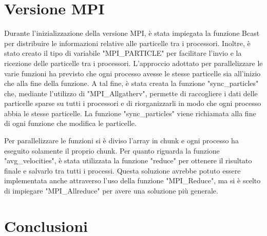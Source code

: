 \documentclass[a4paper,12pt, oneside]{article}
\begin{document}
\section{Versione MPI}

Durante l'inizializzazione della versione MPI, è stata impiegata la funzione Bcast per
distribuire le informazioni relative alle particelle tra i processori. Inoltre, è stato
creato il tipo di variabile "MPI\_PARTICLE" per facilitare l'invio e la ricezione delle
particelle tra i processori.
L'approccio adottato per parallelizzare le varie funzioni ha previsto che ogni processo
avesse le stesse particelle sia all'inizio che alla fine della funzione. A tal fine, è
stata creata la funzione "sync\_particles" che, mediante l'utilizzo di "MPI\_Allgatherv",
permette di raccogliere i dati delle particelle sparse su tutti i processori e di
riorganizzarli in modo che ogni processo abbia le stesse particelle. La funzione
"sync\_particles" viene richiamata alla fine di ogni funzione che modifica le particelle.

Per parallelizzare le funzioni si è diviso l'array in chunk e ogni processo ha eseguito
solamente il proprio chunk. Per quanto riguarda la funzione "avg\_velocities", è stata
utilizzata la funzione "reduce" per ottenere il risultato finale e salvarlo tra tutti i
processi. Questa soluzione avrebbe potuto essere implementata anche attraverso l'uso
della funzione "MPI\_Reduce", ma si è scelto di impiegare "MPI\_Allreduce" per avere 
una soluzione più generale.

\section{Conclusioni}
\end{document}
